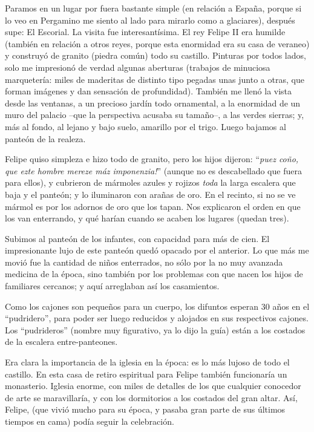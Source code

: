 Paramos en un lugar por fuera bastante simple (en relaci\'on a Espa\~na,
porque si lo veo en Pergamino me siento al lado para mirarlo como a glaciares),
despu\'es supe: El Escorial. La visita fue interesant\'isima. El rey Felipe
II era humilde (tambi\'en en relaci\'on a otros reyes, porque esta enormidad
era su casa de veraneo) y construy\'o de granito (piedra com\'un) todo su
castillo. Pinturas por todos lados, solo me impresion\'o de verdad algunas
aberturas (trabajos de minuciosa marqueter\'ia: miles de maderitas de distinto
tipo pegadas unas junto a otras, que forman im\'agenes y dan sensaci\'on de
profundidad). Tambi\'en me llen\'o la vista desde las ventanas, a un precioso
jard\'in todo ornamental, a la enormidad de un muro del palacio --que la
perspectiva acusaba su tama\~no--, a las verdes sierras; y, m\'as al fondo, al
lejano y bajo suelo, amarillo por el trigo. Luego bajamos al pante\'on de la
realeza.

Felipe quiso simpleza e hizo todo de granito, pero los hijos dijeron:
``\emph{\textexclamdown puez co\~no, que ezte hombre mereze m\'az
imponenzia!}'' (aunque no es descabellado que fuera para ellos), y cubrieron
de m\'armoles azules y rojizos \emph{toda} la larga escalera que baja y el
pante\'on; y lo iluminaron con ara\~nas de oro. En el recinto, si no se ve
m\'armol es por los adornos de oro que los tapan. Nos explicaron el orden en
que los van enterrando, y qu\'e har\'ian cuando se acaben los lugares (quedan
tres).

Subimos al pante\'on de los infantes, con capacidad para m\'as de cien. El
impresionante lujo de este pante\'on qued\'o opacado por el anterior. Lo que
m\'as me movi\'o fue la cantidad de ni\~nos enterrados, no s\'olo por la no muy
avanzada medicina de la \'epoca, sino tambi\'en por los problemas con que nacen
los hijos de familiares cercanos; y aqu\'i arreglaban as\'i los casamientos.

Como los cajones son peque\~nos para un cuerpo, los difuntos esperan 30 a\~nos
en el ``pudridero'', para poder ser luego reducidos y alojados en sus
respectivos cajones. Los ``pudrideros'' (nombre muy figurativo, ya lo dijo la
gu\'ia) est\'an a los costados de la escalera entre-panteones.

Era clara la importancia de la iglesia en la \'epoca: es lo m\'as lujoso de
todo el castillo. En esta casa de retiro espiritual para Felipe tambi\'en
funcionar\'ia un monasterio. Iglesia enorme, con miles de detalles de los que
cualquier conocedor de arte se maravillar\'ia, y con los dormitorios a los
costados del gran altar. As\'i, Felipe, (que vivi\'o mucho para su \'epoca, y
pasaba gran parte de sus \'ultimos tiempos en cama) pod\'ia seguir la
celebraci\'on.

